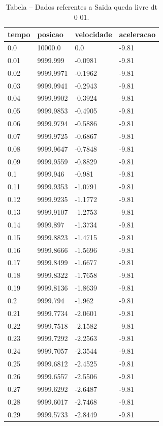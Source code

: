 \begin{table}[H]
\centering
\caption{Tabela – Dados referentes a Saida queda livre dt 0 01.}
\label{tab:saida_queda_livre_dt_0_01}
\begin{tabular}{llll}
\toprule
tempo & posicao & velocidade & aceleracao \\
\midrule
0.0 & 10000.0 & 0.0 & -9.81 \\
0.01 & 9999.999 & -0.0981 & -9.81 \\
0.02 & 9999.9971 & -0.1962 & -9.81 \\
0.03 & 9999.9941 & -0.2943 & -9.81 \\
0.04 & 9999.9902 & -0.3924 & -9.81 \\
0.05 & 9999.9853 & -0.4905 & -9.81 \\
0.06 & 9999.9794 & -0.5886 & -9.81 \\
0.07 & 9999.9725 & -0.6867 & -9.81 \\
0.08 & 9999.9647 & -0.7848 & -9.81 \\
0.09 & 9999.9559 & -0.8829 & -9.81 \\
0.1 & 9999.946 & -0.981 & -9.81 \\
0.11 & 9999.9353 & -1.0791 & -9.81 \\
0.12 & 9999.9235 & -1.1772 & -9.81 \\
0.13 & 9999.9107 & -1.2753 & -9.81 \\
0.14 & 9999.897 & -1.3734 & -9.81 \\
0.15 & 9999.8823 & -1.4715 & -9.81 \\
0.16 & 9999.8666 & -1.5696 & -9.81 \\
0.17 & 9999.8499 & -1.6677 & -9.81 \\
0.18 & 9999.8322 & -1.7658 & -9.81 \\
0.19 & 9999.8136 & -1.8639 & -9.81 \\
0.2 & 9999.794 & -1.962 & -9.81 \\
0.21 & 9999.7734 & -2.0601 & -9.81 \\
0.22 & 9999.7518 & -2.1582 & -9.81 \\
0.23 & 9999.7292 & -2.2563 & -9.81 \\
0.24 & 9999.7057 & -2.3544 & -9.81 \\
0.25 & 9999.6812 & -2.4525 & -9.81 \\
0.26 & 9999.6557 & -2.5506 & -9.81 \\
0.27 & 9999.6292 & -2.6487 & -9.81 \\
0.28 & 9999.6017 & -2.7468 & -9.81 \\
0.29 & 9999.5733 & -2.8449 & -9.81 \\

\end{tabular}
\end{table}
